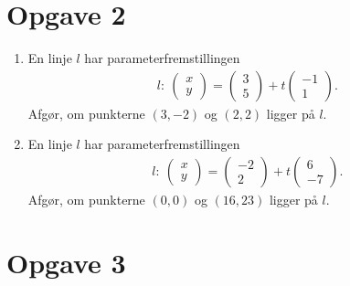\section*{Opgave 2}
\begin{enumerate}[label=\roman*)]
	\item En linje $l$ har parameterfremstillingen
	\begin{align*}
		l: \ 
		\begin{pmatrix}
			x \\ y
		\end{pmatrix}=
		\begin{pmatrix}
			3 \\5
		\end{pmatrix} + t
		\begin{pmatrix}
			-1 \\ 1
		\end{pmatrix}.
	\end{align*}
	Afgør, om punkterne $(3,-2)$ og $(2,2)$ ligger på $l$. 
	\item En linje $l$ har parameterfremstillingen
	\begin{align*}
		l: \ 
		\begin{pmatrix}
			x \\ y
		\end{pmatrix}=
		\begin{pmatrix}
			-2 \\2
		\end{pmatrix} + t
		\begin{pmatrix}
			6 \\ -7  
		\end{pmatrix}.
	\end{align*}
	Afgør, om punkterne $(0,0)$ og $(16,23)$ ligger på $l$. 
\end{enumerate}

\section*{Opgave 3}

